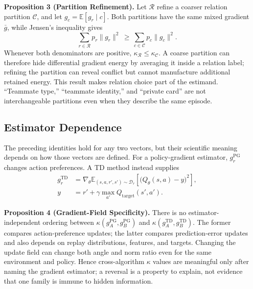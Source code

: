 \documentclass[letterpaper]{article}
\begin{document}
\medskip
\noindent\textbf{Proposition 3 (Partition Refinement).}
Let $\mathcal{R}$ refine a coarser relation partition $\mathcal{C}$, and let
$g_c=\mathbb{E}[g_r\mid c]$.
Both partitions have the same mixed gradient $\bar g$, while Jensen's inequality gives
\begin{equation}
\sum_{r\in\mathcal{R}}p_r\|g_r\|^2
\ \geq\
\sum_{c\in\mathcal{C}}p_c\|g_c\|^2.
\label{eq:refinement}
\end{equation}
Whenever both denominators are positive,
$\kappa_{\mathcal{R}}\leq\kappa_{\mathcal{C}}$.
A coarse partition can therefore hide differential gradient energy by averaging it inside a relation label; refining the partition can reveal conflict but cannot manufacture additional retained energy.
This result makes relation choice part of the estimand.
``Teammate type,'' ``teammate identity,'' and ``private card'' are not interchangeable partitions even when they describe the same episode.

\subsection{Estimator Dependence}

The preceding identities hold for any two vectors, but their scientific meaning depends on how those vectors are defined.
For a policy-gradient estimator, $g_r^{\mathrm{PG}}$ changes action preferences.
A TD method instead supplies
\begin{equation}
\begin{split}
g_r^{\mathrm{TD}}
&=
\nabla_\theta
\mathbb{E}_{(s,a,r',s')\sim\mathcal{D}_r}
\left[
\bigl(Q_\theta(s,a)-y\bigr)^2
\right],\\
y&=r'+\gamma\max_{a'}Q_{\mathrm{target}}(s',a').
\end{split}
\label{eq:tdgrad}
\end{equation}

\medskip
\noindent\textbf{Proposition 4 (Gradient-Field Specificity).}
There is no estimator-independent ordering between
$\kappa(g_A^{\mathrm{PG}},g_B^{\mathrm{PG}})$ and
$\kappa(g_A^{\mathrm{TD}},g_B^{\mathrm{TD}})$.
The former compares action-preference updates; the latter compares prediction-error updates and also depends on replay distributions, features, and targets.
Changing the update field can change both angle and norm ratio even for the same environment and policy.
Hence cross-algorithm $\kappa$ values are meaningful only after naming the gradient estimator; a reversal is a property to explain, not evidence that one family is immune to hidden information.
\end{document}
